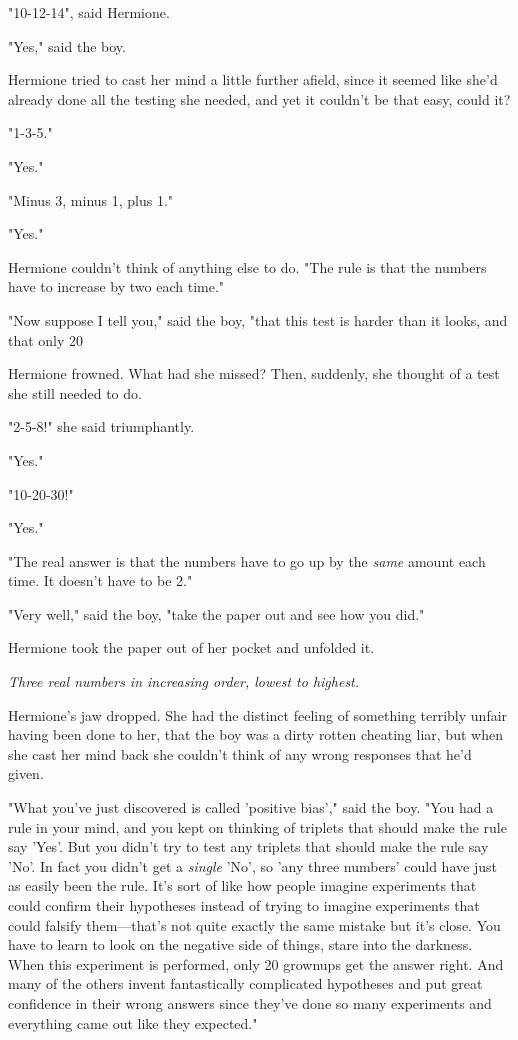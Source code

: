 "10-12-14", said Hermione.

"Yes," said the boy.

Hermione tried to cast her mind a little further afield, since it seemed like 
she'd already done all the testing she needed, and yet it couldn't be that 
easy, could it?

"1-3-5."

"Yes."

"Minus 3, minus 1, plus 1."

"Yes."

Hermione couldn't think of anything else to do. "The rule is that the numbers 
have to increase by two each time."

"Now suppose I tell you," said the boy, "that this test is harder than it 
looks, and that only 20%

Hermione frowned. What had she missed? Then, suddenly, she thought of a test 
she still needed to do.

"2-5-8!" she said triumphantly.

"Yes."

"10-20-30!"

"Yes."

"The real answer is that the numbers have to go up by the \emph{same} amount 
each time. It doesn't have to be 2."

"Very well," said the boy, "take the paper out and see how you did."

Hermione took the paper out of her pocket and unfolded it.

\emph{Three real numbers in increasing order, lowest to highest.}

Hermione's jaw dropped. She had the distinct feeling of something terribly 
unfair having been done to her, that the boy was a dirty rotten cheating liar, 
but when she cast her mind back she couldn't think of any wrong responses that 
he'd given.

"What you've just discovered is called 'positive bias'," said the boy. "You had 
a rule in your mind, and you kept on thinking of triplets that should make the 
rule say 'Yes'. But you didn't try to test any triplets that should make the 
rule say 'No'. In fact you didn't get a \emph{single} 'No', so 'any three 
numbers' could have just as easily been the rule. It's sort of like how people 
imagine experiments that could confirm their hypotheses instead of trying to 
imagine experiments that could falsify them---that's not quite exactly the same 
mistake but it's close. You have to learn to look on the negative side of 
things, stare into the darkness. When this experiment is performed, only 20%
grownups get the answer right. And many of the others invent fantastically 
complicated hypotheses and put great confidence in their wrong answers since 
they've done so many experiments and everything came out like they expected."

